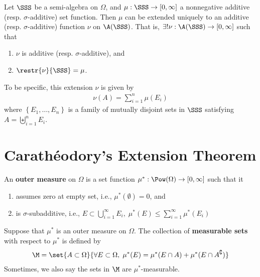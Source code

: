 \documentclass[thmcnt=section, 12pt]{elegantbook}
\begin{document}
\begin{theorem} \label{thm:1}
    Let $\SSS$ be a semi-algebra on $\Omega$, and $\mu: \SSS \to [0, \infty]$ a nonnegative additive (resp. $\sigma$-additive) set function. Then $\mu$ can be extended uniquely to an additive (resp. $\sigma$-additive) function $\nu$ on $\A(\SSS)$. That is, $\exists! \nu: \A(\SSS) \to [0, \infty]$ such that
    \begin{enumerate}
        \item $\nu$ is additive (resp. $\sigma$-additive), and 
        \item $\restr{\nu}{\SSS} = \mu$.
    \end{enumerate}
    To be specific, this extension $\nu$ is given by 
    \begin{align*}
        \nu(A) = \sum_{i=1}^n \mu(E_i)
    \end{align*}
    where $\left\{E_1, \ldots, E_n\right\}$ is a family of mutually disjoint sets in $\SSS$ satisfying $A = \biguplus_{i=1}^n E_i$.
\end{theorem}


\section{Carathéodory's Extension Theorem}


\begin{definition} \label{def:1} %
    An \textbf{outer measure} on $ \Omega $ is a set function $ \mu^\ast : \Pow(\Omega) \to [0, \infty] $ such that it
    \begin{enumerate}
        \item assumes zero at empty set, i.e., $ \mu^\ast(\emptyset) = 0 $, and
        \item is $ \sigma $-subadditive, i.e., $ E \subset \bigcup_{i=1}^\infty {E_i}, \; \mu^\ast(E) \leq \sum_{i=1}^\infty {\mu^\ast(E_i)} $
    \end{enumerate}
\end{definition}


\begin{definition}
    Suppose that $ \mu^\ast $ is an outer measure on $ \Omega $. The collection of \textbf{measurable sets} with respect to $ \mu^\ast $ is defined by 
    \begin{align*}
        \M = \set{A \subset \Omega}{\forall E \subset \Omega, \; \mu^\ast(E) = \mu^\ast(E \cap A) + \mu^\ast(E \cap A^\complement)}
    \end{align*}
    Sometimes, we also say the sets in $ \M $ are $ \mu^\ast $-measurable.
\end{definition}
\end{document}
